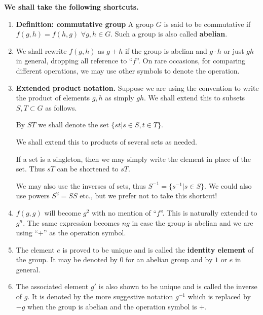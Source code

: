 \documentclass[12pt]{article}
\newcommand{\deff}[1]{{\bf Definition: #1} }
\newcommand{\addtoc}[1]{\addcontentsline{toc}{subsection}{#1}}
\begin{document}
\addtoc{Shortcuts.}
{\bf We shall take the following shortcuts.}
\begin{enumerate}
\item \deff{commutative group} A group $G$ is said to be commutative if
$f(g,h)=f(h,g)$ $\forall g,h \in G$. Such a group is also called {\bf
abelian}.

\item We shall rewrite $f(g,h)$ as $g+h$ if the group is abelian and
$g\cdot h$ or just $gh$ in general, dropping all reference to ``$f$''.
On rare occasions, for comparing different operations, we may use other
symbols to denote the operation.

\item {\bf Extended product notation.}
Suppose we are using the
convention to write the product of elements $g,h$ as simply $gh$.
We shall extend this to subsets $S,T\subset G$ as follows.

By $ST$ we shall denote the set $\{st | s\in S,t\in T\}$.

We shall extend this to products of several sets as needed.

If a set is a singleton, then we may simply write the element in place
of the set. Thus ${s}T$ can be shortened to $sT$.

We may also use the inverses of sets, thus $S^{-1}=\{s^{-1}|s\in S\}$.
We could also use powers $S^2 = SS$ etc., but we prefer not to take this
shortcut!

\item $f(g,g)$ will become $g^2$ with no mention of ``$f$''. This is
naturally extended to $g^n$. The same expression becomes $ng$ in case
the group is abelian and we are using ``$+$'' as the operation symbol.

\item The element $e$ is proved to be unique and is called the
{\bf identity element} of the group.
It may be  denoted by $0$ for an abelian group and by $1$ or $e$  in general.

\item The associated element $g'$ is also shown to be unique and is
called the inverse of $g$. It is denoted by the more suggestive notation
$g^{-1}$ which is replaced by $-g$ when the group is abelian and the
operation symbol is $+$.



\end{enumerate}
\end{document}
